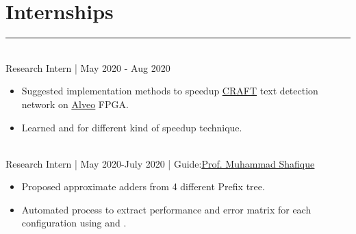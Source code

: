 \documentclass[]{resume}
\begin{document}
\begin{minipage}[t]{0.69\textwidth}
\section{Internships}
\vspace{-0.5em}
\noindent\rule{13cm}{0.4pt}

\vspace{0.2em}
\hspace{0.5em}
\\
\hspace*{0.5em} Research Intern | May 2020 - Aug 2020 \\ 
\vspace{-2em}
\descript{}
\begin{itemize}
    \item Suggested implementation methods to speedup \href{https://arxiv.org/abs/1904.01941}{\underline{CRAFT}} text detection network on \href{https://www.xilinx.com/products/boards-and-kits/alveo.html}{\underline{Alveo}} FPGA. 
    \vspace{-0.6em}\\
    \item Learned  and  for different kind of speedup technique. 
\end{itemize}
\sectionsep

\vspace{-0.8em}
\hspace{0.5em}
\\
\hspace*{0.5em} Research Intern | May 2020-July 2020 | Guide:\href{mailto: Muhammad.shafique@tuwien.ac.at}{\underline{Prof. Muhammad Shafique}} \\ 
\vspace{-2em}
\descript{}
\begin{itemize}
    \item Proposed  approximate adders from 4 different Prefix tree.
    \vspace{-0.6em}
    \item Automated process to extract performance and error matrix for each configuration using  and .
\end{itemize}
\sectionsep


\end{minipage}
\end{document}
